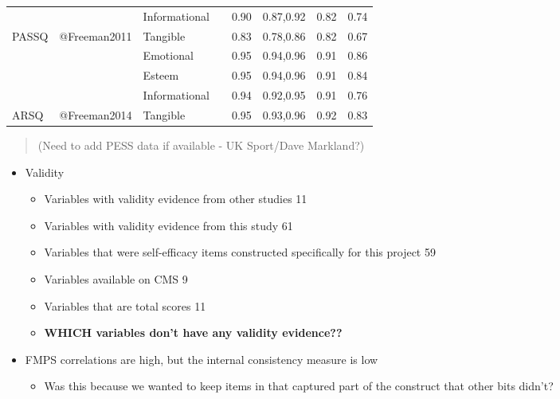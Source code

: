 \documentclass[a4paper,]{book}
\providecommand{\tightlist}{%
  \setlength{\itemsep}{0pt}\setlength{\parskip}{0pt}}
\begin{document}
\begin{table}
\begin{tabular}[t]{lllrrlrr}
 &  & Informational &  & 0.90 & 0.87,0.92 & 0.82 & 0.74\\
\cmidrule{3-3}
\cmidrule{5-8}
\multirow[t]{-4}{*}{\raggedright\arraybackslash PASSQ} & \multirow[t]{-4}{*}{\raggedright\arraybackslash @Freeman2011} & Tangible &  & 0.83 & 0.78,0.86 & 0.82 & 0.67\\
\cmidrule{1-3}
\cmidrule{5-8}
 &  & Emotional &  & 0.95 & 0.94,0.96 & 0.91 & 0.86\\
\cmidrule{3-3}
\cmidrule{5-8}
 &  & Esteem &  & 0.95 & 0.94,0.96 & 0.91 & 0.84\\
\cmidrule{3-3}
\cmidrule{5-8}
 &  & Informational &  & 0.94 & 0.92,0.95 & 0.91 & 0.76\\
\cmidrule{3-3}
\cmidrule{5-8}
\multirow[t]{-4}{*}{\raggedright\arraybackslash ARSQ} & \multirow[t]{-4}{*}{\raggedright\arraybackslash @Freeman2014} & Tangible & \multirow[t]{-8}{*}{\raggedleft\arraybackslash 219} & 0.95 & 0.93,0.96 & 0.92 & 0.83\\
\bottomrule
\end{tabular}
\end{table}

\begin{quote}
(Need to add PESS data if available - UK Sport/Dave Markland?)
\end{quote}

\begin{itemize}
\tightlist
\item
  Validity

  \begin{itemize}
  \tightlist
  \item
    Variables with validity evidence from other studies 11
  \item
    Variables with validity evidence from this study 61
  \item
    Variables that were self-efficacy items constructed specifically for this project 59
  \item
    Variables available on CMS 9
  \item
    Variables that are total scores 11
  \item
    \textbf{WHICH variables don't have any validity evidence??}
  \end{itemize}
\item
  FMPS correlations are high, but the internal consistency measure is low

  \begin{itemize}
  \tightlist
  \item
    Was this because we wanted to keep items in that captured part of the construct that other bits didn't?
  \end{itemize}
\end{itemize}
\end{document}
